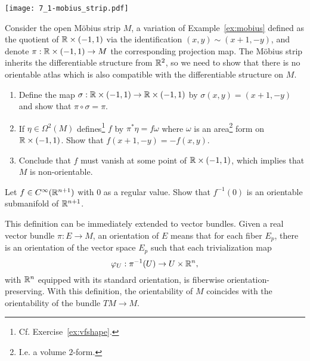 \begin{marginfigure}
  \texttt{[image: 7\_1-mobius\_strip.pdf]}
\end{marginfigure}

\begin{exercise}
  Consider the open M\"obius strip $M$, a variation of Example~\ref{ex:mobius} defined as the quotient of $\mathbb{R}\times(-1,1)$ via the identification $(x,y) \sim (x+1, -y)$, and denote $\pi: \mathbb{R}\times(-1,1)\to M$ the corresponding projection map.
  The M\"obius strip inherits the differentiable structure from $\mathbb{R}^2$, so we need to show that there is no orientable atlas which is also compatible with the differentiable structure on $M$.
  \begin{enumerate}
    \item Define the map $\sigma:\mathbb{R}\times(-1,1)\to\mathbb{R}\times(-1,1)$ by $\sigma(x,y) = (x+1, -y)$ and show that $\pi\circ\sigma = \pi$.
    \item If $\eta\in\Omega^2(M)$ defines\footnote{Cf. Exercise~\ref{ex:vfshape}.} $f$ by $\pi^* \eta = f \omega$ where $\omega$ is an area\footnote{I.e. a volume $2$-form.} form on $\mathbb{R}\times(-1,1)$.
    Show that $f(x+1, -y) = - f(x,y)$.
    \item Conclude that $f$ must vanish at some point of $\mathbb{R}\times(-1,1)$, which implies that $M$ is non-orientable.
  \end{enumerate}
\end{exercise}

\begin{exercise}
  Let $f\in C^\infty(\mathbb{R}^{n+1})$ with $0$ as a regular value.
  Show that $f^{-1}(0)$ is an orientable submanifold of $\mathbb{R}^{n+1}$.
\end{exercise}

\begin{remark}
  This definition can be immediately extended to vector bundles.
  Given a real vector bundle $\pi: E \to M$, an orientation of $E$ means that for each fiber $E_p$, there is an orientation of the vector space $E_p$ such that each trivialization map
  \begin{equation}
    \varphi_{U}:\pi^{-1}(U)\to U\times \mathbb{R}^{n},
  \end{equation}
  with $\mathbb{R}^n$ equipped with its standard orientation, is fiberwise orientation-preserving.
  With this definition, the orientability of $M$ coincides with the orientability of the bundle $TM\to M$.
\end{remark}

